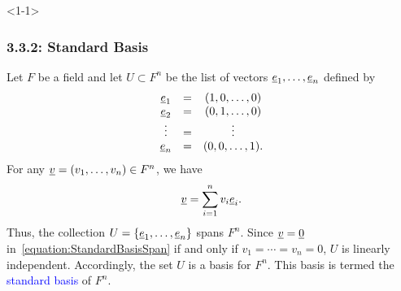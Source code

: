 \documentclass[10pt,english,aspectratio=169]{beamer}
\begin{document}
\begin{frame}<1-1> \frametitle{3.3.2: Standard Basis}
\begin{example}
Let $F$ be a field and let $U \subset F^n$ be the list of vectors $\underline{e}_1, \ldots, \underline{e}_n$ defined by
\begin{equation*}
\begin{array}{ccc}
\underline{e}_1 & = & (1, 0, \ldots, 0) \\
\underline{e}_2 & = & (0, 1, \ldots, 0) \\
\vdots & = & \vdots \\
\underline{e}_n & = & (0, 0, \ldots, 1).
\end{array}
\end{equation*}
For any $\underline{v} = (v_1, \ldots, v_n) \in F^n$, we have
\begin{equation} \label{equation:StandardBasisSpan}
\underline{v} = \sum_{i=1}^n v_i \underline{e}_i.
\end{equation}
Thus, the collection $U = \left\{ \underline{e}_1, \ldots, \underline{e}_n \right\}$ spans $F^n$.
Since $\underline{v} = \underline{0}$ in~\eqref{equation:StandardBasisSpan} if and only if $v_1 = \cdots = v_n = 0$, $U$ is linearly independent.
Accordingly, the set $U$ is a basis for $F^{n}$.
This basis is termed the \textcolor{blue}{standard basis} of $F^n$.
\end{example}


\end{frame}
\end{document}

